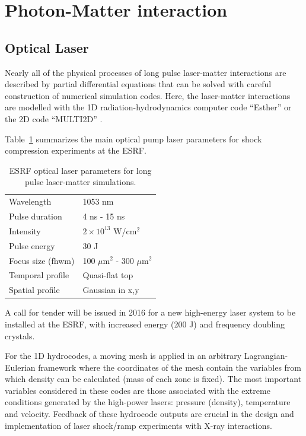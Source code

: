 \documentclass[12pt]{scrartcl}
\begin{document}
\section{Photon-Matter interaction}
\subsection{Optical Laser}
Nearly all of the physical processes of long pulse laser-matter interactions are described by partial differential
equations that can be solved with careful construction of numerical simulation codes. Here, the laser-matter
interactions are modelled with the 1D radiation-hydrodynamics computer code ``Esther'' \cite{Colombier2005}
or the 2D code ``MULTI2D'' \cite{Ramis2009}.

Table~\ref{tab:esrf_long_pulse} summarizes the main optical pump laser
parameters for shock compression experiments at the ESRF.

\begin{table}[h]
  \centering
  \begin{tabular}{l|l}
    \hline
    \hline
Wavelength & 1053 nm \\
Pulse duration & 4 ns - 15 ns \\
Intensity & $2\times 10^{13}$ W/cm$^2$ \\
Pulse energy & 30 J \\
Focus size (fhwm) & 100 $\mu\text{m}^{2}$ - 300 $\mu\text{m}^{2}$  \\
Temporal profile  & Quasi-flat top \\
Spatial profile & Gaussian in x,y \\
    \hline
    \hline
  \end{tabular}
  \caption{ESRF optical laser parameters for long pulse laser-matter
  simulations.}
  \label{tab:esrf_long_pulse}
\end{table}

A call for tender will be issued in 2016 for a new high-energy laser system to be installed at the ESRF, with increased energy (200 J) and
frequency doubling crystals.

For the 1D hydrocodes, a moving mesh is applied in an arbitrary Lagrangian-Eulerian framework where the coordinates of
the mesh contain the variables from which density can be calculated (mass of
each zone is fixed). The most important variables
considered in these codes are those associated with the extreme conditions generated by the high-power lasers: pressure (density),
temperature and velocity. Feedback of these hydrocode outputs are crucial in the design and implementation of laser shock/ramp
experiments with X-ray interactions.
\end{document}
